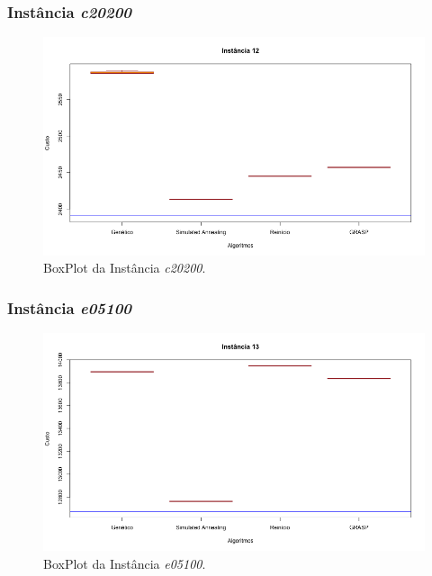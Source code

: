 \documentclass[portugues, brazil, a4paper,12pt]{article}
\begin{document}
		\subsubsection{Instância \textit{c20200}}
			\begin{figure}[H]
				\centering
				\includegraphics[width=1\linewidth]{img/12.png}
				\caption{BoxPlot da Instância \textit{c20200}.}
				\label{fig:c20200}
			\end{figure}


	
		\subsubsection{Instância \textit{e05100}}
			\begin{figure}[H]
				\centering
				\includegraphics[width=1\linewidth]{img/13.png}
				\caption{BoxPlot da Instância \textit{e05100}.}
				\label{fig:e05100}
			\end{figure}
	
\end{document}
